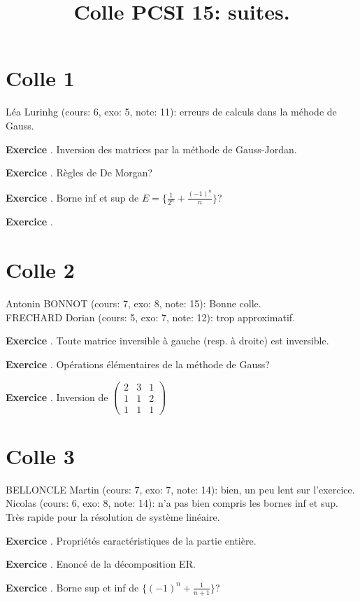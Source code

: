\documentclass[10pt,a4paper]{article}
\title{Colle PCSI 15: suites.}
\newcounter{question}
\newcounter{exo}
\newenvironment{exo}{\vspace{0.5cm}\setcounter{question}{0}\addtocounter{exo}{1} \noindent \textbf{Exercice \theexo}. \normalsize }{\par}
\begin{document}
	\maketitle
	
	
	\section*{Colle 1}
	\setcounter{exo}{0}
	Léa Lurinhg (cours: 6, exo: 5, note: 11): erreurs de calculs dans la méhode de Gauss.\\
	
	\begin{exo}
		Inversion des matrices par la méthode de Gauss-Jordan.
	\end{exo}
	
	\begin{exo}
		Règles de De Morgan?
	\end{exo}
	
	\begin{exo}
		Borne inf et sup de $E = \lbrace \frac{1}{2^n} + \frac{(-1)^n}{n} \rbrace$?
	\end{exo}

	\begin{exo}
	\end{exo}
	
	\section*{Colle 2}
	\setcounter{exo}{0}
	Antonin BONNOT (cours: 7, exo: 8, note: 15): Bonne colle.\\
	FRECHARD Dorian (cours: 5, exo: 7, note: 12): trop approximatif.\\
	
	\begin{exo}
		Toute matrice inversible à gauche (resp. à droite) est inversible.
	\end{exo}
	
	\begin{exo}
		Opérations élémentaires de la méthode de Gauss?
	\end{exo}		

	\begin{exo}
		Inversion de $\begin{pmatrix}
			2 & 3 & 1 \\ 
			1 & 1 & 2 \\ 
			1 & 1 & 1
		\end{pmatrix} $
	\end{exo}		
	\section*{Colle 3}
	\setcounter{exo}{0}
	BELLONCLE Martin (cours: 7, exo: 7, note: 14): bien, un peu lent sur l'exercice.\\
	Nicolas (cours: 6, exo: 8, note: 14): n'a pas bien compris les bornes inf et sup. Très rapide pour la résolution de système linéaire.\\
		
	\begin{exo}
		Propriétés caractéristiques de la partie entière.
	\end{exo}
	
	\begin{exo}
		Enoncé de la décomposition ER.
	\end{exo}	

	\begin{exo}
		Borne sup et inf de $\lbrace (-1)^n + \frac{1}{n+1} \rbrace$?
	\end{exo}	
	
\end{document}
